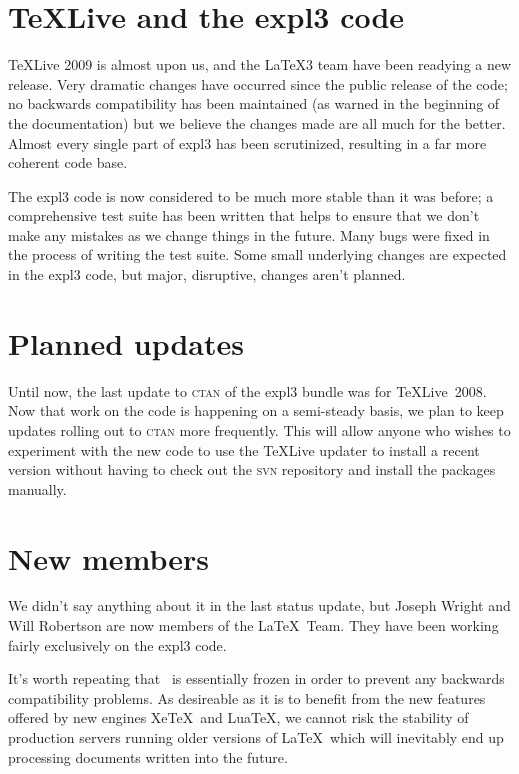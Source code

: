 \documentclass{ltnews}
\begin{document}
\maketitle

\section{\TeX Live and the \textsf{expl3} code}

\TeX Live 2009 is almost upon us, and the \LaTeX3 team have been
readying a new release. Very dramatic changes have occurred since the
public release of the code; no backwards compatibility has been
maintained (as warned in the beginning of the documentation) but we
believe the changes made are all much for the better. Almost every
single part of \textsf{expl3} has been scrutinized, resulting in a far
more coherent code base.

The \textsf{expl3} code is now considered to be much more stable than
it was before; a comprehensive test suite has been written that helps
to ensure that we don't make any mistakes as we change things in the
future. Many bugs were fixed in the process of writing the test
suite. Some small underlying changes are expected in the
\textsf{expl3} code, but major, disruptive, changes aren't planned.

\section{Planned updates}

Until now, the last update to \textsc{ctan} of the \textsf{expl3}
bundle was for \TeX Live~2008. Now that work on the code is happening
on a semi-steady basis, we plan to keep updates rolling out to
\textsc{ctan} more frequently. This will allow anyone who wishes to
experiment with the new code to use the \TeX Live updater to install a
recent version without having to check out the \textsc{svn} repository
and install the packages manually.

\section{New members}

We didn't say anything about it in the last status update, but Joseph
Wright and Will Robertson are now members of the \LaTeX\ Team. They
have been working fairly exclusively on the \textsf{expl3} code. 

It's worth repeating that \LaTeXe\ is essentially frozen in order to
prevent any backwards compatibility problems. As desireable as it is
to benefit from the new features offered by new engines Xe\TeX\ and
Lua\TeX, we cannot risk the stability of production servers running
older versions of \LaTeX\ which will inevitably end up processing
documents written into the future.
\end{document}
